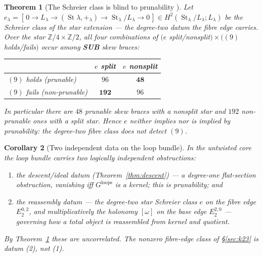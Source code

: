 \documentclass[11pt]{article}
\newtheorem{theorem}{Theorem}
\newtheorem{corollary}[theorem]{Corollary}
\theoremstyle{definition}
\newcommand{\Z}{\mathbb{Z}}
\newcommand{\loops}{\mathrm{loops}}
\newcommand{\St}{\operatorname{St}}
\begin{document}
\begin{theorem}[The Schreier class is blind to prunability {\cite[Thm.~C]{descent}}]\label{thm:blind}
Let $e_\lambda=[\,0\to L_\lambda\to(\St\lambda,+_\lambda)\to\St_\lambda/L_\lambda\to0\,]\in
H^2(\St_\lambda/L_\lambda;L_\lambda)$ be the Schreier class of the star extension --- the
degree-two datum the fibre edge carries. Over the star $\Z/4\times\Z/2$, all four combinations of
$(e$ split/nonsplit$)\times((9)$ holds/fails$)$ occur among \textbf{SUB} skew braces:
\begin{center}\small
\begin{tabular}{lcc}
\toprule
 & $e$ split & $e$ nonsplit\\
\midrule
$(9)$ holds (prunable)     & $96$  & $\mathbf{48}$\\
$(9)$ fails (non-prunable) & $\mathbf{192}$ & $96$\\
\bottomrule
\end{tabular}
\end{center}
In particular there are $48$ prunable skew braces with a \emph{nonsplit} star and $192$
non-prunable ones with a \emph{split} star. Hence $e$ neither implies nor is implied by
prunability: the degree-two fibre class does not detect $(9)$.
\end{theorem}

\begin{corollary}[Two independent data on the loop bundle]\label{cor:twodata}
In the untwisted core the loop bundle carries two logically independent obstructions:
\begin{enumerate}
\item[\textup{(1)}] the \emph{descent/ideal} datum (Theorem~\ref{thm:descent}) --- a
\emph{degree-one} flat-section obstruction, vanishing iff $G^{\loops}$ is a kernel; this is
prunability; and
\item[\textup{(2)}] the \emph{reassembly} datum --- the \emph{degree-two} star Schreier class $e$
on the fibre edge $E_2^{0,2}$, and multiplicatively the holonomy $[\omega]$ on the base edge
$E_2^{2,0}$ --- governing how a total object is reassembled from kernel and quotient.
\end{enumerate}
By Theorem~\ref{thm:blind} these are uncorrelated. The nonzero fibre-edge class of \S\ref{sec:k23}
is datum \textup{(2)}, not \textup{(1)}.
\end{corollary}
\end{document}
